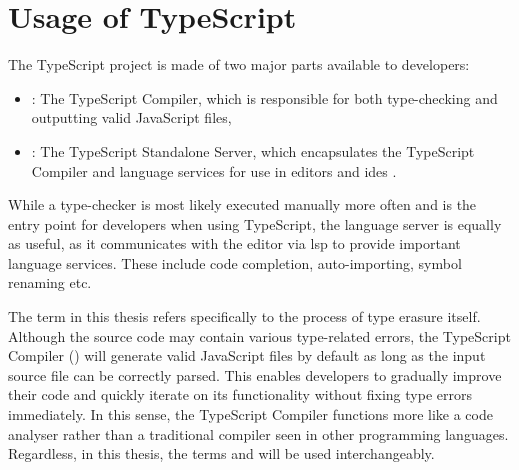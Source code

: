 \section{Usage of TypeScript}

The TypeScript project is made of two major parts available to developers:

\begin{itemize}
  \item {}: The TypeScript Compiler, which is responsible for both type-checking and outputting valid JavaScript files,
  \item {}: The TypeScript Standalone Server, which encapsulates the TypeScript Compiler and language services for use in editors and \acrshort{ide}s \cite{StandaloneServerTsserver}.
\end{itemize}

While a type-checker is most likely executed manually more often and is the entry point for developers when using TypeScript, the language server is equally as useful, as it communicates with the editor via \acrfull{lsp} to provide important language services. These include code completion, auto-importing, symbol renaming etc.

The term  in this thesis refers specifically to the process of type erasure itself. Although the source code may contain various type-related errors, the TypeScript Compiler () will generate valid JavaScript files by default as long as the input source file can be correctly parsed. This enables developers to gradually improve their code and quickly iterate on its functionality without fixing type errors immediately. In this sense, the TypeScript Compiler functions more like a code analyser rather than a traditional compiler seen in other programming languages. Regardless, in this thesis, the terms  and  will be used interchangeably.